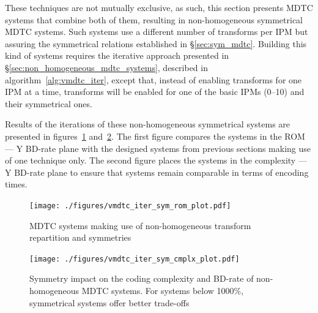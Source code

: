 \documentclass[11pt,a4paper,openright,twoside]{book}
\numberwithin{equation}{section} %
\numberwithin{figure}{section} %
\numberwithin{table}{section} %
\begin{document}
These techniques are not mutually exclusive, as such, this section presents
\ac{MDTC} systems that combine both of them, resulting in non-homogeneous
symmetrical \ac{MDTC} systems.
Such systems use a different number of transforms per \ac{IPM} but assuring
the symmetrical relations established in \S\ref{sec:sym_mdtc}.
Building this kind of systems requires the iterative approach presented in
\S\ref{sec:non_homogeneous_mdtc_systems}, described in
algorithm~\ref{alg:vmdtc_iter}, except that, instead of enabling transforms
for one \ac{IPM} at a time, transforms will be enabled for one of the basic
\acp{IPM} (0--10) and their symmetrical ones.

Results of the iterations of these non-homogeneous symmetrical systems are
presented in figures~\ref{fig:vmdtc_iter_sym_rom}
and~\ref{fig:vmdtc_iter_sym_complx}.
The first figure compares the systems in the \acs{ROM} --- Y \acs{BD}-rate
plane with the designed systems from previous sections making use of one
technique only.
The second figure places the systems in the complexity --- Y \acs{BD}-rate
plane to ensure that systems remain comparable in terms of encoding times.

\begin{figure}[tb]
	\centering
	\texttt{[image: ./figures/vmdtc\_iter\_sym\_rom\_plot.pdf]}
	\caption{\acs{MDTC} systems making use of non-homogeneous transform
	repartition and symmetries}
	\label{fig:vmdtc_iter_sym_rom}
\end{figure}

\begin{figure}[tb]
	\centering
	\texttt{[image: ./figures/vmdtc\_iter\_sym\_cmplx\_plot.pdf]}
	\caption[Symmetry impact on the coding complexity and \acs{BD}-rate of
	non-homogeneous \acs{MDTC} systems]
	{Symmetry impact on the coding complexity and \acs{BD}-rate of
	non-homogeneous \acs{MDTC} systems.
	For systems below 1000\%, symmetrical systems offer better trade-offs}
	\label{fig:vmdtc_iter_sym_complx}
\end{figure}
\end{document}
